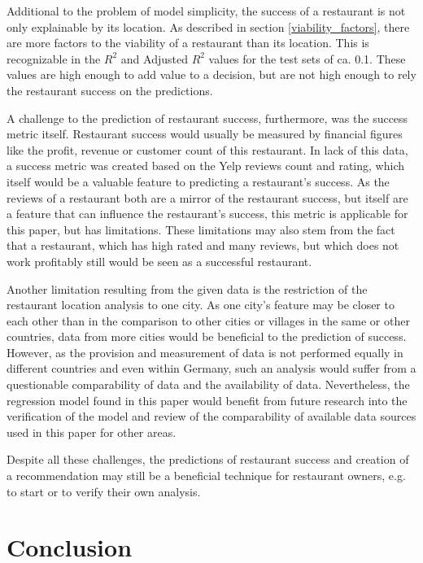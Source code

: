 \documentclass[a4paper, 11pt, oneside]{Thesis}  %
\begin{document}
Additional to the problem of model simplicity, the success of a restaurant is not only explainable by its location. As described in section \ref{viability_factors}, there are more factors to the viability of a restaurant than its location. This is recognizable in the $R^2$ and Adjusted $R^2$ values for the test sets of ca. 0.1. These values are high enough to add value to a decision, but are not high enough to rely the restaurant success on the predictions.

A challenge to the prediction of restaurant success, furthermore, was the success metric itself. Restaurant success would usually be measured by financial figures like the profit, revenue or customer count of this restaurant. In lack of this data, a success metric was created based on the Yelp reviews count and rating, which itself would be a valuable feature to predicting a restaurant's success. As the reviews of a restaurant both are a mirror of the restaurant success, but itself are a feature that can influence the restaurant's success, this metric is applicable for this paper, but has limitations. These limitations may also stem from the fact that a restaurant, which has high rated and many reviews, but which does not work profitably still would be seen as a successful restaurant.

Another limitation resulting from the given data is the restriction of the restaurant location analysis to one city. As one city's feature may be closer to each other than in the comparison to other cities or villages in the same or other countries, data from more cities would be beneficial to the prediction of success. However, as the provision and measurement of data is not performed equally in different countries and even within Germany, such an analysis would suffer from a questionable comparability of data and the availability of data. Nevertheless, the regression model found in this paper would benefit from future research into the verification of the model and review of the comparability of available data sources used in this paper for other areas.

Despite all these challenges, the predictions of restaurant success and creation of a recommendation may still be a beneficial technique for restaurant owners, e.g. to start or to verify their own analysis.

\chapter{Conclusion}
\label{Conclusion}
\end{document}
